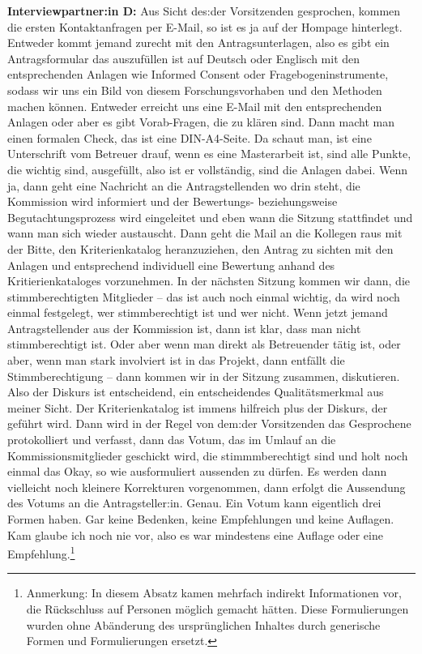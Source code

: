 \documentclass[a4paper,12pt,twoside]{scrreprt}
\begin{document}
\textbf{Interviewpartner:in D:} Aus Sicht des:der Vorsitzenden gesprochen, kommen die ersten Kontaktanfragen per E-Mail, so ist es ja auf der Hompage hinterlegt. Entweder kommt jemand zurecht mit den Antragsunterlagen, also es gibt ein Antragsformular das auszufüllen ist auf Deutsch oder Englisch mit den entsprechenden Anlagen wie Informed Consent oder Fragebogeninstrumente, sodass wir uns ein Bild von diesem Forschungsvorhaben und den Methoden machen können. Entweder erreicht uns eine E-Mail mit den entsprechenden Anlagen oder aber es gibt Vorab-Fragen, die zu klären sind. Dann macht man einen formalen Check, das ist eine DIN-A4-Seite. Da schaut man, ist eine Unterschrift vom Betreuer drauf, wenn es eine Masterarbeit ist, sind alle Punkte, die wichtig sind, ausgefüllt, also ist er vollständig, sind die Anlagen dabei. Wenn ja, dann geht eine Nachricht an die Antragstellenden wo drin steht, die Kommission wird informiert und der Bewertungs- beziehungsweise Begutachtungsprozess wird eingeleitet und eben wann die Sitzung stattfindet und wann man sich wieder austauscht. Dann geht die Mail an die Kollegen raus mit der Bitte, den Kriterienkatalog heranzuziehen, den Antrag zu sichten mit den Anlagen und entsprechend individuell eine Bewertung anhand des Kritierienkataloges vorzunehmen. In der nächsten Sitzung kommen wir dann, die stimmberechtigten Mitglieder -- das ist auch noch einmal wichtig, da wird noch einmal festgelegt, wer stimmberechtigt ist und wer nicht. Wenn jetzt jemand Antragstellender aus der Kommission ist, dann ist klar, dass man nicht stimmberechtigt ist. Oder aber wenn man direkt als Betreuender tätig ist, oder aber, wenn man stark involviert ist in das Projekt, dann entfällt die Stimmberechtigung -- dann kommen wir in der Sitzung zusammen, diskutieren. Also der Diskurs ist entscheidend, ein entscheidendes Qualitätsmerkmal aus meiner Sicht. Der Kriterienkatalog ist immens hilfreich plus der Diskurs, der geführt wird. Dann wird in der Regel von dem:der Vorsitzenden das Gesprochene protokolliert und verfasst, dann das Votum, das im Umlauf an die Kommissionsmitglieder geschickt wird, die stimmmberechtigt sind und holt noch einmal das Okay, so wie ausformuliert aussenden zu dürfen. Es werden dann vielleicht noch kleinere Korrekturen vorgenommen, dann erfolgt die Aussendung des Votums an die Antragsteller:in. Genau. Ein Votum kann eigentlich drei Formen haben. Gar keine Bedenken, keine Empfehlungen und keine Auflagen. Kam glaube ich noch nie vor, also es war mindestens eine Auflage oder eine Empfehlung.\footnote{Anmerkung: In diesem Absatz kamen mehrfach indirekt Informationen vor, die Rückschluss auf Personen möglich gemacht hätten. Diese Formulierungen wurden ohne Abänderung des ursprünglichen Inhaltes durch generische Formen und Formulierungen ersetzt.}
\end{document}
